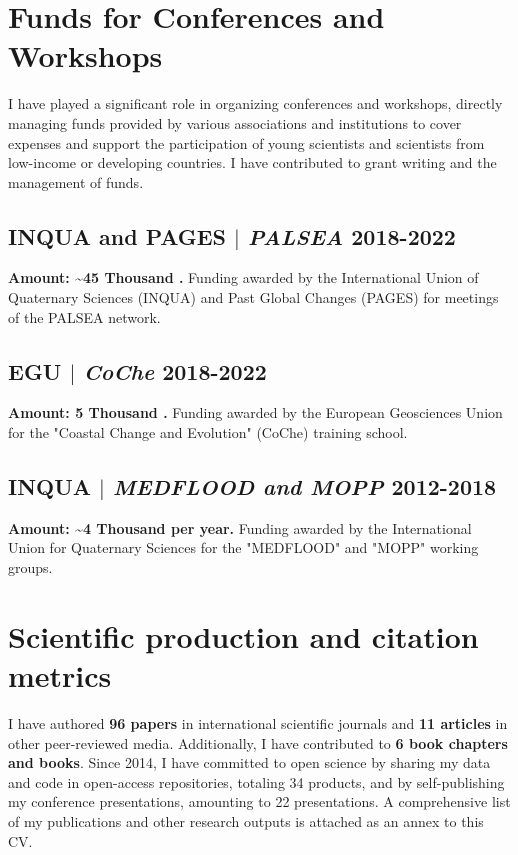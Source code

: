 \documentclass[11pt]{article}
\begin{document}
\section{Funds for Conferences and Workshops}
{\normalfont I have played a significant role in organizing conferences and workshops, directly managing funds provided by various associations and institutions to cover expenses and support the participation of young scientists and scientists from low-income or developing countries. I have contributed to grant writing and the management of funds.}\\

\bigskip

\subsection{INQUA and PAGES $|$ {\normalfont\textit{PALSEA}} \hfill 2018-2022}
{\footnotesize \textbf{Amount: \textasciitilde 45 Thousand \texteuro.} Funding awarded by the International Union of Quaternary Sciences (INQUA) and Past Global Changes (PAGES) for meetings of the PALSEA network.}
\bigskip

\subsection{EGU $|$ {\normalfont\textit{CoChe}} \hfill 2018-2022}
{\footnotesize \textbf{Amount: 5 Thousand \texteuro.} Funding awarded by the European Geosciences Union for the "Coastal Change and Evolution" (CoChe) training school.}
\bigskip

\subsection{INQUA $|$ {\normalfont\textit{MEDFLOOD and MOPP}} \hfill 2012-2018}
{\footnotesize \textbf{Amount: \textasciitilde 4 Thousand \texteuro \space per year.} Funding awarded by the International Union for Quaternary Sciences for the "MEDFLOOD" and "MOPP" working groups.}
\bigskip

\newpage

\section{Scientific production and citation metrics}
\bigskip

{\normalfont I have authored \textbf{96 papers} in international scientific journals and \textbf{11 articles} in other peer-reviewed media. Additionally, I have contributed to \textbf{6 book chapters and books}. Since 2014, I have committed to open science by sharing my data and code in open-access repositories, totaling 34 products, and by self-publishing my conference presentations, amounting to 22 presentations. A comprehensive list of my publications and other research outputs is attached as an annex to this CV.}
\end{document}
